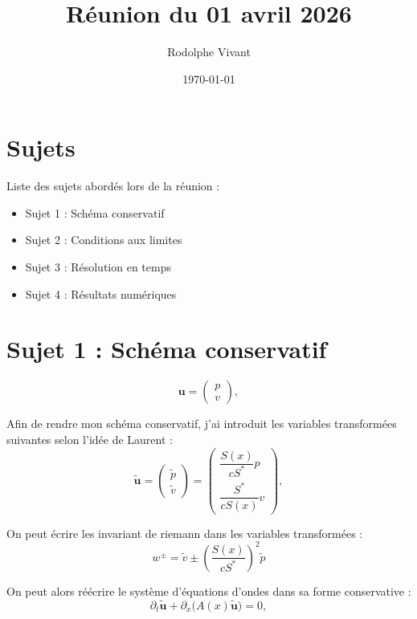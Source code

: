 \documentclass[12pt,a4paper]{article}
\title{Réunion du 01 avril 2026}
\author{Rodolphe Vivant}
\date{\today}
\begin{document}
\maketitle

\section{Sujets}
Liste des sujets abordés lors de la réunion :
\begin{itemize}
    \item Sujet 1 : Schéma conservatif
    \item Sujet 2 : Conditions aux limites
    \item Sujet 3 : Résolution en temps
    \item Sujet 4 : Résultats numériques
\end{itemize}

\section{Sujet 1 : Schéma conservatif}

\begin{equation}
\mathbf{u} =
\begin{pmatrix}
p \\
v
\end{pmatrix},
\end{equation}

Afin de rendre mon schéma conservatif, j'ai introduit les variables transformées suivantes selon l'idée de Laurent :
\begin{equation}
\mathbf{\tilde{u}} =
\begin{pmatrix}
\tilde{p} \\
\tilde{v}
\end{pmatrix}
=
\begin{pmatrix}
\dfrac{S(x)}{c S^\ast} p \\
\dfrac{S^\ast}{c S(x)} v
\end{pmatrix},
\end{equation}

On peut écrire les invariant de riemann dans les variables transformées :
\begin{equation}
w^{\pm} = \tilde{v} \pm \left(\frac{S(x)}{c S^\ast}\right)^2 \tilde{p}
\end{equation}


On peut alors réécrire le système d'équations d'ondes dans sa forme conservative :
\begin{equation}
\partial_t \mathbf{\tilde{u}} + \partial_x \big( A(x)\mathbf{\tilde{u}} \big) = 0,
\label{eq:conservative_form}
\end{equation}
\end{document}
